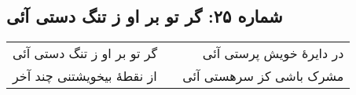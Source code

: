 \begin{center}
\section*{شماره ۲۵: گر تو بر او ز تنگ دستی آئی}
\label{sec:025}
\begin{longtable}{l p{0.5cm} r}
گر تو بر او ز تنگ دستی آئی
&&
در دایرهٔ خویش پرستی آئی
\\
از نقطهٔ بیخویشتنی چند آخر
&&
مشرک باشی کز سرهستی آئی
\\
\end{longtable}
\end{center}
